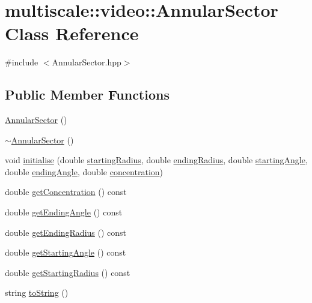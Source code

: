 \hypertarget{classmultiscale_1_1video_1_1AnnularSector}{\section{multiscale\-:\-:video\-:\-:Annular\-Sector Class Reference}
\label{classmultiscale_1_1video_1_1AnnularSector}
}


{\ttfamily \#include $<$Annular\-Sector.\-hpp$>$}

\subsection*{Public Member Functions}
\begin{DoxyCompactItemize}
\item 
\hyperlink{classmultiscale_1_1video_1_1AnnularSector_a96ea49d6d05346ef9ae99289945eb578}{Annular\-Sector} ()
\item 
\hyperlink{classmultiscale_1_1video_1_1AnnularSector_a2ced14f6af200e6e4c1c5f3e189bde4b}{$\sim$\-Annular\-Sector} ()
\item 
void \hyperlink{classmultiscale_1_1video_1_1AnnularSector_a58217c07c5c28c33f541fc37d429d79b}{initialise} (double \hyperlink{classmultiscale_1_1video_1_1AnnularSector_a4c0094d8993edb40b15580fa58a8a393}{starting\-Radius}, double \hyperlink{classmultiscale_1_1video_1_1AnnularSector_aa45c5399240707d0b3fc02ee86b97c79}{ending\-Radius}, double \hyperlink{classmultiscale_1_1video_1_1AnnularSector_a437d3dc1b2fadace28bdc3d26a78c0b3}{starting\-Angle}, double \hyperlink{classmultiscale_1_1video_1_1AnnularSector_a0aebd11072dbefe42196d6bda2e4318d}{ending\-Angle}, double \hyperlink{classmultiscale_1_1video_1_1AnnularSector_a7f6a1e7618c9e2a10e35efb5740395b1}{concentration})
\item 
double \hyperlink{classmultiscale_1_1video_1_1AnnularSector_aee1181ae47b33a40fb2103149e45e7f1}{get\-Concentration} () const 
\item 
double \hyperlink{classmultiscale_1_1video_1_1AnnularSector_acc074c86ca7e06ac8d5873a200498dce}{get\-Ending\-Angle} () const 
\item 
double \hyperlink{classmultiscale_1_1video_1_1AnnularSector_acf9600073991cf0448ab2b2997ed4513}{get\-Ending\-Radius} () const 
\item 
double \hyperlink{classmultiscale_1_1video_1_1AnnularSector_a85931ba16351fffc33b5a8fc714cb4b8}{get\-Starting\-Angle} () const 
\item 
double \hyperlink{classmultiscale_1_1video_1_1AnnularSector_aef4f23e921eae6438889f0f1537bb3ef}{get\-Starting\-Radius} () const 
\item 
string \hyperlink{classmultiscale_1_1video_1_1AnnularSector_ab277036c93f9dcabc08e13ca49c78e53}{to\-String} ()
\end{DoxyCompactItemize}
